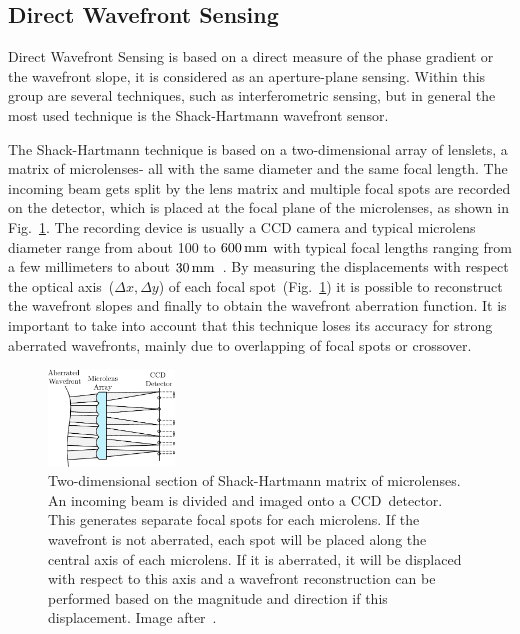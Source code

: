 \subsection{Direct Wavefront Sensing}
\label{sec:WavefrontSensing}

Direct Wavefront Sensing is based on a direct measure of the phase gradient or the wavefront slope, it is considered as an aperture-plane sensing. Within this group are several techniques, such as interferometric sensing, but in general the most used technique is the Shack-Hartmann wavefront sensor. 

The Shack-Hartmann technique is based on a two-dimensional array of lenslets, a matrix of microlenses- all with the same diameter and the same focal length. The incoming beam gets split by the lens matrix and multiple focal spots are recorded on the detector, which is placed at the focal plane of the microlenses, as shown in Fig.~\ref{fig:SH}. The recording device is usually a CCD camera and typical microlens diameter range from about 100 to $\unit[600]{mm}$ with typical focal lengths ranging from a few millimeters to about $\unit[30]{mm}$~\cite{AO_vision_science}. By measuring the displacements with respect the optical axis~($\Delta x, \Delta y$) of each focal spot~(Fig.~\ref{fig:SH}) it is possible to reconstruct the wavefront slopes and finally to obtain the wavefront aberration function. It is important to take into account that this technique loses its accuracy for strong aberrated wavefronts, mainly due to overlapping of focal spots or crossover.

\begin{figure}[htbp]
	\centering
		\includegraphics[width=0.30\textwidth]{images/SH}
	\caption{Two-dimensional section of Shack-Hartmann matrix of microlenses. An incoming beam is divided and imaged onto a CCD~detector. This generates separate focal spots for each microlens. If the wavefront is not aberrated, each spot will be placed along the central axis of each microlens. If it is aberrated, it will be displaced with respect to this axis and a wavefront reconstruction can be performed based on the magnitude and direction if this displacement. Image after~\cite{optical_shop_testing}.}
	\label{fig:SH}
\end{figure}


